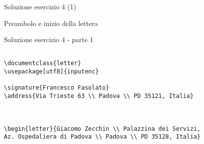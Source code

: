 \begin{frame}[fragile]{Soluzione esercizio 4 (1)}

Preambolo e inizio della lettera
\begin{soluzione}{Soluzione esercizio 4 - parte 1}
\begin{code}
\begin{verbatim}

\documentclass{letter}
\usepackage[utf8]{inputenc}

\signature{Francesco Fasolato}
\address{Via Trieste 63 \\ Padova \\ PD 35121, Italia}



\begin{letter}{Giacomo Zecchin \\ Palazzina dei Servizi, 
Az. Ospedaliera di Padova \\ Padova \\ PD 35128, Italia}
\end{verbatim}
\end{code}

\end{soluzione}

\end{frame}